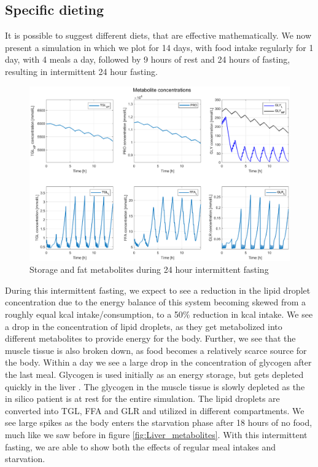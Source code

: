 \documentclass{IEEEtran}
\begin{document}
\subsection{Specific dieting}

It is possible to suggest different diets, that are effective mathematically. We now present a simulation in which we plot for 14 days, with food intake regularly for 1 day, with 4 meals a day, followed by 9 hours of rest and 24 hours of fasting, resulting in intermittent 24 hour fasting. 

\begin{figure}[H]
    \centering
    \includegraphics[trim=75 10 75 0, clip,width=\columnwidth, height=0.30\textheight]{Diagrams/Food/metabolites_14_days_no_food_33_hours.eps}
    \caption{Storage and fat metabolites during 24 hour intermittent fasting}
    \label{fig:my_label}
\end{figure}

During this intermittent fasting, we expect to see a reduction in the lipid droplet concentration due to the energy balance of this system becoming skewed from a roughly equal kcal intake/consumption, to a 50\% reduction in kcal intake. We see a drop in the concentration of lipid droplets, as they get metabolized into different metabolites to provide energy for the body. Further, we see that the muscle tissue is also broken down, as food becomes a relatively scarce source for the body. Within a day we see a large drop in the concentration of glycogen after the last meal. Glycogen is used initially as an energy storage, but gets depleted quickly in the liver \cite{miesfeld_mcevoy_2017}. The glycogen in the muscle tissue is slowly depleted as the in silico patient is at rest for the entire simulation. The lipid droplets are converted into TGL, FFA and GLR and utilized in different compartments. We see large spikes as the body enters the starvation phase after 18 hours of no food, much like we saw before in figure \ref{fig:Liver_metabolites}. With this intermittent fasting, we are able to show both the effects of regular meal intakes and starvation. \\
\end{document}
